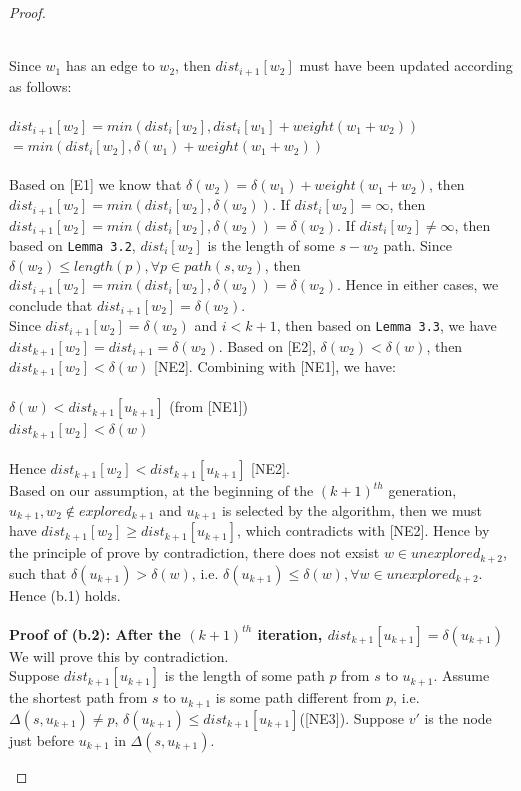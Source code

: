 \begin{proof}
\begin{itemize}
  \\
  Since $w_1$ has an edge to $w_2$, then $dist_{i+1}[w_2]$ must have been updated according as follows: 
  \\\\
  \tab\tab $dist_{i+1}[w_2] = min(dist_i[w_2], dist_i[w_1] + weight(w_1 + w_2))$ \\
  \tab\tab\tab $= min(dist_i[w_2], \delta(w_1) + weight(w_1 + w_2))$
  \\\\
  Based on [E1] we know that $\delta(w_2) =  \delta(w_1) + weight(w_1 + w_2)$, then $dist_{i+1}[w_2] = min(dist_i[w_2], \delta(w_2))$. If $dist_i[w_2] = \infty$, then $dist_{i+1}[w_2] = min(dist_i[w_2], \delta(w_2)) = \delta(w_2)$. If $dist_i[w_2] \neq \infty$, then based on \texttt{Lemma 3.2}, $dist_i[w_2]$ is the length of some $s-w_2$ path. Since $\delta(w_2) \leq length(p), \forall p \in path(s, w_2)$, then $dist_{i+1}[w_2] = min(dist_i[w_2], \delta(w_2)) = \delta(w_2)$. Hence in either cases, we conclude that $dist_{i+1}[w_2] = \delta(w_2)$. 
  \\
  Since $dist_{i+1}[w_2] = \delta(w_2)$ and $i < k+1$, then based on \texttt{Lemma 3.3}, we have $dist_{k+1}[w_2] = dist_{i+1} = \delta(w_2)$. Based on [E2], $\delta(w_2) < \delta(w)$, then $dist_{k+1}[w_2] < \delta(w)$ [NE2]. Combining with [NE1], we have: 
  \\\\
  \ftab $\delta(w) < dist_{k+1}[u_{k+1}]$ (from [NE1])\\
  \ftab $dist_{k+1}[w_2] < \delta(w)$ 
  \\\\
  Hence $dist_{k+1}[w_2] < dist_{k+1}[u_{k+1}]$ [NE2]. 
  \\
  Based on our assumption, at the beginning of the $(k+1)^{th}$ generation, $u_{k+1}, w_2 \notin explored_{k+1}$ and $u_{k+1}$ is selected by the algorithm, then we must have $dist_{k+1}[w_2] \geq dist_{k+1}[u_{k+1}]$, which contradicts with [NE2]. Hence by the principle of prove by contradiction, there does not exsist $w \in unexplored_{k+2}$, such that $\delta(u_{k+1}) > \delta(w)$, i.e. $\delta(u_{k+1}) \leq \delta(w), \forall w \in unexplored_{k+2}$. Hence (b.1) holds. 
  \\\\
  \textbf{Proof of (b.2): After the $(k+1)^{th}$ iteration, $dist_{k+1}[u_{k+1}] = \delta(u_{k+1})$}
  \\
  We will prove this by contradiction. 
  \\
  Suppose $dist_{k+1}[u_{k+1}]$ is the length of some path $p$ from $s$ to $u_{k+1}$. Assume the shortest path from $s$ to $u_{k+1}$ is some path different from $p$, i.e. $\Delta(s, u_{k+1}) \neq p$, $\delta(u_{k+1}) \leq dist_{k+1}[u_{k+1}]$([NE3]). Suppose $v'$ is the node just before $u_{k+1}$ in $\Delta(s, u_{k+1})$. 

\end{itemize}
\end{proof}
